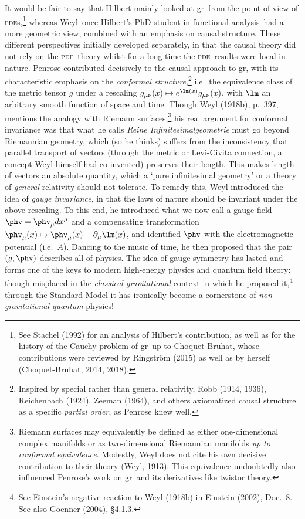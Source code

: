 \documentclass[12pt]{article}
\newcommand{\pde}{\textsc{pde}}
\newcommand{\p}{\partial}
\newcommand{\GR}{{\sc gr}}
\begin{document}
 It would be fair to say that Hilbert mainly looked at \GR\ from the point of view of \pde s,\footnote{See 
   Stachel (1992) for an analysis of Hilbert's contribution, as well as for the history of the Cauchy problem of \GR\ up to Choquet-Bruhat, whose contributions were reviewed by  Ringstr\"{o}m (2015) as well as by herself 
    (Choquet-Bruhat, 2014, 2018).} whereas Weyl--once Hilbert's PhD student in functional analysis--had a more geometric view, combined with an emphasis on causal structure.  These different perspectives initially developed  separately, in that the causal theory did not rely on the \pde\ theory whilst for a long time the  \pde\ results were  local in nature.  Penrose contributed decisively to the causal approach to \GR, with its
 characteristic emphasis on the \emph{conformal structure},\footnote{Inspired by special rather than general relativity,  Robb (1914, 1936), Reichenbach (1924),  Zeeman (1964), and  others axiomatized causal structure as a specific \emph{partial order}, as Penrose knew well. } i.e.\ the equivalence class of the metric tensor $g$ under a rescaling $g_{\mu\nu}(x)\mapsto e^{\lm(x)} g_{\mu\nu}(x)$, 
  with $\lm$ an arbitrary smooth function of space and time. Though Weyl (1918b), p.\ 397,  mentions the analogy with Riemann surfaces,\footnote{Riemann surfaces  may equivalently be defined as either one-dimensional complex manifolds or as  two-dimensional Riemannian manifolds \emph{up to conformal equivalence}. 
 Modestly, Weyl does not cite his own decisive contribution to their theory (Weyl, 1913).  This equivalence undoubtedly also influenced Penrose's work on \GR\  and its derivatives like twistor theory. } his real argument for conformal invariance was  that what he calls \emph{Reine Infinitesimalgeometrie} must go beyond Riemannian geometry, which (so he thinks) suffers from the inconsistency that parallel transport of vectors (through the metric or Levi-Civita connection, a concept Weyl himself had co-invented) preserves their length. This makes length of vectors an absolute quantity, which a  `pure infinitesimal geometry' or a theory of \emph{general} relativity should not tolerate. To remedy this, Weyl introduced the idea of \emph{gauge invariance},  in that the laws of nature should be invariant under the above rescaling. To this end, he introduced what we now call a gauge field $\phv=\phv_{\mu}dx^{\mu}$ and
 a compensating transformation $\phv_{\mu}(x)\mapsto  \phv_{\mu}(x)-\p_{\mu} \lm(x)$, and identified $\phv$ with the electromagnetic potential (i.e.\ $A$). Dancing to the music of time, he then proposed that the pair $(g,\phv)$ describes all of physics. The idea of gauge symmetry has lasted and forms one of the keys to modern high-energy physics and quantum field theory: 
   though misplaced in the \emph{classical gravitational} context in which he proposed it,\footnote{See Einstein's negative reaction to Weyl (1918b) in Einstein (2002), Doc.\ 8. See also Goenner (2004), \S 4.1.3. }  through the Standard Model it has ironically become a cornerstone of \emph{non-gravitational quantum} physics! 
\end{document}
